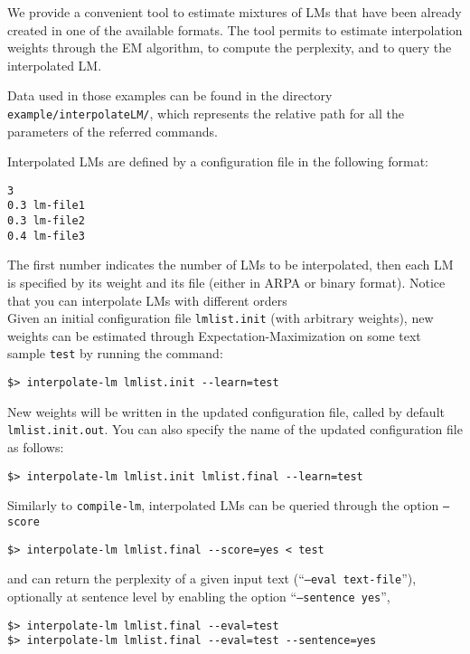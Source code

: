 We provide a convenient tool to estimate mixtures of LMs that have been already 
created in one of the available formats.  The tool permits to estimate interpolation
weights through the EM algorithm, to compute the perplexity, and to query the interpolated
LM. 

\noindent
Data used in those examples can be found in the directory {\tt example/interpolateLM/},
which represents the relative path for all the parameters of the referred commands.

\noindent
Interpolated LMs are defined by a configuration file in the following format:
\begin{verbatim}
3
0.3 lm-file1
0.3 lm-file2
0.4 lm-file3
\end{verbatim}

\noindent
The first number indicates the number of LMs to be interpolated, then each LM is specified
by its weight and its file (either in ARPA or binary format). Notice that you can interpolate
LMs with different orders\\

\noindent
Given an initial configuration file {\tt lmlist.init} (with arbitrary weights), new weights can be estimated
through Expectation-Maximization on some text sample {\tt test} by running the command:
\begin{verbatim}
$> interpolate-lm lmlist.init --learn=test
\end{verbatim}
\noindent
New weights will be written in the updated configuration file, called by default {\tt lmlist.init.out}.
You can also specify the name of the updated configuration file as follows:

\begin{verbatim}
$> interpolate-lm lmlist.init lmlist.final --learn=test
\end{verbatim}


\noindent
Similarly to {\tt compile-lm}, interpolated LMs can be queried through the option {\tt --score}

\begin{verbatim}
$> interpolate-lm lmlist.final --score=yes < test
\end{verbatim}

\noindent
and can return the perplexity of a given input text (``{\tt --eval text-file}''), optionally  at sentence level  by enabling the option ``{\tt --sentence yes}'',

\begin{verbatim}
$> interpolate-lm lmlist.final --eval=test 
$> interpolate-lm lmlist.final --eval=test --sentence=yes
\end{verbatim}


